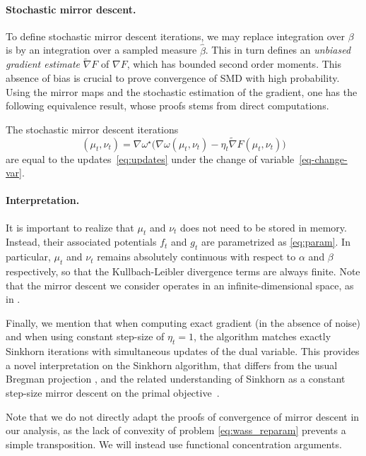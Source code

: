 \paragraph{Stochastic mirror descent.}

To define stochastic mirror descent iterations, we may replace integration over $\beta$ is by an integration over a sampled measure $\hat \beta$. This in turn defines an \textit{unbiased gradient estimate} $\tilde \nabla F$ of $\nabla F$, which has bounded second order moments.
%
This absence of bias is crucial to prove convergence of SMD with high
probability. Using the mirror maps and the stochastic estimation of the
gradient, one has the following equivalence result, whose proofs stems from
direct computations. 

\begin{proposition}
The stochastic mirror descent iterations
\begin{equation}
    (\mu_t, \nu_t) = \nabla \omega^\star\Big( \nabla \omega(\mu_t, \nu_t) - 
    \eta_t \tilde \nabla F(\mu_t, \nu_t)\Big)
\end{equation}
are equal to the updates~\eqref{eq:updates} under the change of variable~\eqref{eq-change-var}.
\end{proposition}

\paragraph{Interpretation.} 

It is important to realize that $\mu_t$ and $\nu_t$ does not need to be stored in memory. Instead,
their associated potentials $f_t$ and $g_t$ are parametrized as
\eqref{eq:param}. In particular, $\mu_t$ and $\nu_t$ remains absolutely
continuous with respect to $\alpha$ and $\beta$ respectively, so that the
Kullbach-Leibler divergence terms are always finite. Note that the mirror descent
we consider operates in an infinite-dimensional space, as in \citet{hsieh2018finding}.

Finally, we mention that  when computing exact gradient (in the absence of noise) and when using constant step-size of
$\eta_t=1$, the algorithm matches exactly Sinkhorn iterations with simultaneous updates of the dual variable. This provides a novel interpretation on the Sinkhorn algorithm, that differs from the usual Bregman projection \citep{benamou2015iterative}, and the related understanding of Sinkhorn as a constant step-size mirror descent on the primal objective~\citep{mishchenko2019sinkhorn}. 

Note that we do not directly adapt the proofs of convergence of mirror descent in our
analysis, as the lack of convexity of problem \eqref{eq:wass_reparam} prevents a simple transposition.
We will instead use functional concentration arguments.

